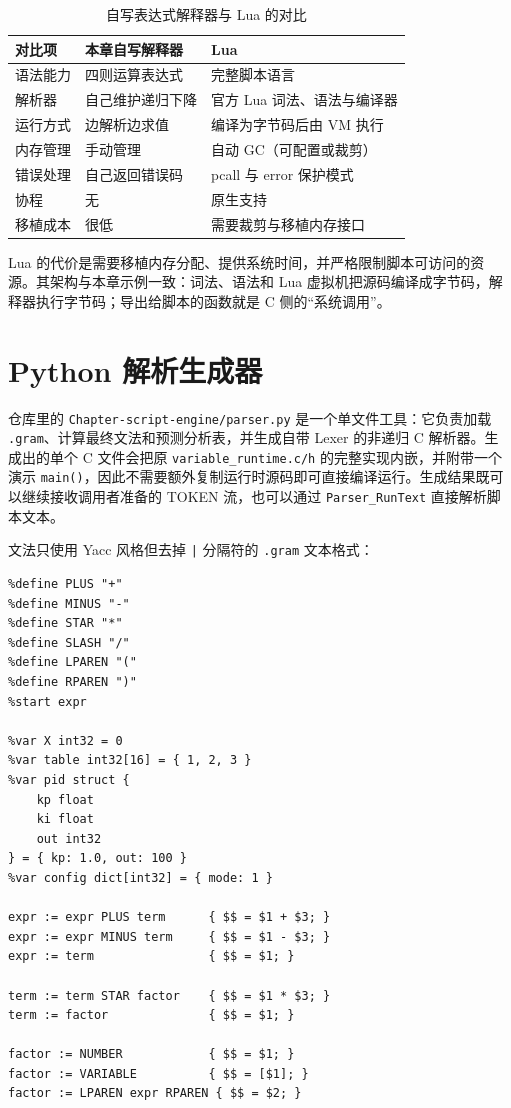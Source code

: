 \begin{table}[htbp]
\centering \caption{自写表达式解释器与 Lua 的对比} \label{tab:lua-advantage}
    \begin{tabular}{lll}
        \toprule
        对比项 & 本章自写解释器 & Lua \\
        \midrule
        语法能力 & 四则运算表达式 & 完整脚本语言 \\
        解析器 & 自己维护递归下降 & 官方 Lua 词法、语法与编译器 \\
        运行方式 & 边解析边求值 & 编译为字节码后由 VM 执行 \\
        内存管理 & 手动管理 & 自动 GC（可配置或裁剪） \\
        错误处理 & 自己返回错误码 & pcall 与 error 保护模式 \\
        协程 & 无 & 原生支持 \\
        移植成本 & 很低 & 需要裁剪与移植内存接口 \\
        \bottomrule
    \end{tabular}
\end{table}

Lua 的代价是需要移植内存分配、提供系统时间，并严格限制脚本可访问的资源。其架构与本章示例一致：词法、语法和 Lua 虚拟机把源码编译成字节码，解释器执行字节码；导出给脚本的函数就是 C 侧的“系统调用”。

\section{Python 解析生成器}

仓库里的 \texttt{Chapter-script-engine/parser.py} 是一个单文件工具：它负责加载 \texttt{.gram}、计算最终文法和预测分析表，并生成自带 Lexer 的非递归 C 解析器。生成出的单个 C 文件会把原 \texttt{variable\_runtime.c/h} 的完整实现内嵌，并附带一个演示 \texttt{main()}，因此不需要额外复制运行时源码即可直接编译运行。生成结果既可以继续接收调用者准备的 TOKEN 流，也可以通过 \texttt{Parser\_RunText} 直接解析脚本文本。

文法只使用 Yacc 风格但去掉 \texttt{|} 分隔符的 \texttt{.gram} 文本格式：

\begin{lstlisting}
%define PLUS "+"
%define MINUS "-"
%define STAR "*"
%define SLASH "/"
%define LPAREN "("
%define RPAREN ")"
%start expr

%var X int32 = 0
%var table int32[16] = { 1, 2, 3 }
%var pid struct {
    kp float
    ki float
    out int32
} = { kp: 1.0, out: 100 }
%var config dict[int32] = { mode: 1 }

expr := expr PLUS term      { $$ = $1 + $3; }
expr := expr MINUS term     { $$ = $1 - $3; }
expr := term                { $$ = $1; }

term := term STAR factor    { $$ = $1 * $3; }
term := factor              { $$ = $1; }

factor := NUMBER            { $$ = $1; }
factor := VARIABLE          { $$ = [$1]; }
factor := LPAREN expr RPAREN { $$ = $2; }
\end{lstlisting}

